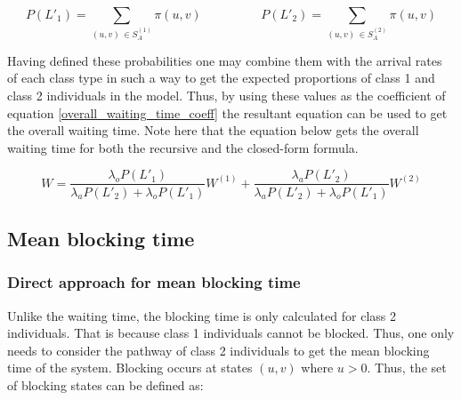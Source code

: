 \begin{equation*}
    P(L'_1) = \sum_{(u,v) \, \in S_A^{(1)}} \pi(u,v) \hspace{2cm}
    P(L'_2) = \sum_{(u,v) \, \in S_A^{(2)}} \pi(u,v)
\end{equation*}

Having defined these probabilities one may combine them with the arrival rates of 
each class type in such a way to get the expected proportions of class 1 and 
class 2 individuals in the model. 
Thus, by using these values as the coefficient of equation 
\ref{overall_waiting_time_coeff} 
the resultant equation can be used to get the overall waiting time. 
Note here that the equation below gets the overall waiting time for both the recursive 
and the closed-form formula.

\begin{equation}\label{overall_waiting_time}
    W = \frac{\lambda_o P(L'_1)}{\lambda_a P(L'_2) + \lambda_o P(L'_1)} W^{(1)} + 
    \frac{\lambda_a P(L'_2)}{\lambda_a P(L'_2) + \lambda_o P(L'_1)} W^{(2)}
\end{equation}





\subsection{Mean blocking time}

\subsubsection{Direct approach for mean blocking time}

Unlike the waiting time, the blocking time is only calculated for class 2 individuals.  
That is because class 1 individuals cannot be blocked. 
Thus, one only needs to consider the pathway of class 2 individuals to get the 
mean blocking time of the system. 
Blocking occurs at states \((u,v)\) where \(u > 0 \). 
Thus, the set of blocking states can be defined as:

